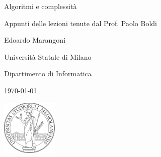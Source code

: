 \documentclass[12pt, a4paper,titlepage]{book}
\numberwithin{theorem}{chapter}
\begin{document}
\pagestyle{fancy}
\renewcommand{\headrulewidth}{0pt} %
\renewcommand{\footrulewidth}{0pt} %
\renewcommand{\chaptermark}[1]{\markboth{#1}{}}
\fancyhead[LE]{\thepage \ \ }
\fancyhead[RO]{\MakeUppercase\leftmark \ \ \thepage}
\fancyfoot[C] {\thepage}


\frontmatter
\begin{titlepage}
	\centering
	\vspace*{6cm}
	\Huge{Algoritmi e complessità}

	\vspace*{0.5cm}

	\Large{Appunti delle lezioni tenute dal Prof. Paolo Boldi}

	\vspace*{2.5cm}

	\Large{Edoardo Marangoni}

	\vspace*{2cm}

	\small{Università Statale di Milano}

	\small{Dipartimento di Informatica}

	\small{\today}

	\vspace*{2cm}
	\includegraphics[width=0.2\textwidth]{images/unimi.png}

\end{titlepage}

\mainmatter
\pagestyle{fancy}
\renewcommand{\headrulewidth}{0pt}
\renewcommand{\chaptermark}[1]{\markboth{#1}{}}
\fancyhf{}
\fancyhead[LE]{\thepage \ \ \MakeUppercase\leftmark}
\fancyhead[RE, LO]{\MakeUppercase\chaptertitlename \ \ \thechapter}
\fancyhead[RO]{\rightmark \ \ \thepage}
\fancyfoot[C]{\thepage}



\tableofcontents






\cleardoublepage

\appendix




\end{document}
